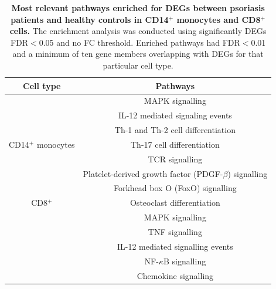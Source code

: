 \begin{table}[htbp]
\centering
\begin{tabular}{@{} c c}
\toprule
\textbf{Cell type} & \textbf{Pathways} \\
\midrule
\midrule
                      & MAPK signalling \\
                      & IL-12 mediated signaling events \\
				              & Th-1 and Th-2 cell differentiation \\
CD14$^+$ monocytes    & Th-17 cell differentiation \\
				              & TCR signalling \\
				              & Platelet-derived growth factor (PDGF-$\beta$) signalling\\
				              & Forkhead box O (FoxO) signalling \\
\midrule				
CD8$^+$  & Osteoclast differentiation \\
         & MAPK signalling \\
				 & TNF signalling \\
         & IL-12 mediated signalling events \\
				 & NF-$\kappa$B signalling \\
				 & Chemokine signalling \\
\bottomrule
\end{tabular}
\medskip %
\caption[Most relevant pathways enriched for DEGs between psoriasis patients and healthy controls in CD14$^+$ monocytes and CD8$^+$ cells.]{\textbf{Most relevant pathways enriched for DEGs between psoriasis patients and healthy controls in CD14$^+$ monocytes and CD8$^+$ cells.} The enrichment analysis was conducted using significantly DEGs FDR$<$0.05 and no FC threshold. Enriched pathways had FDR$<$0.01 and a minimum of ten gene members overlapping with DEGs for that particular cell type.}
\label{tab:RNAseq_PS_CTL_pathway_enrichment}
\end{table}


